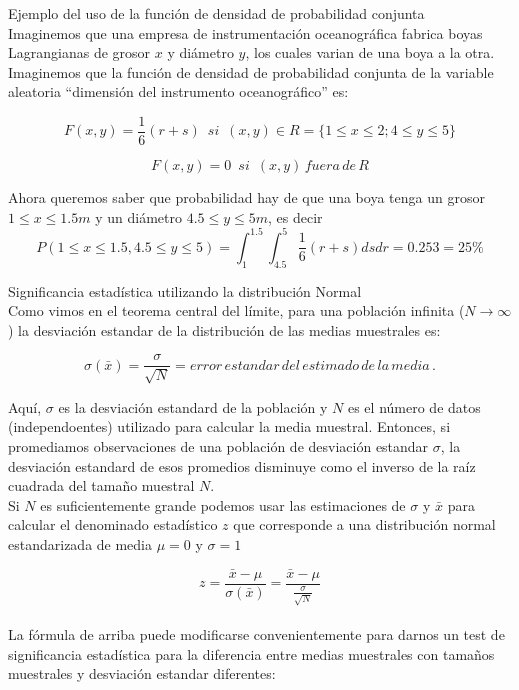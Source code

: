 \documentclass[
]{agujournal2019}
\begin{document}
Ejemplo del uso de la función de densidad de probabilidad conjunta\\

Imaginemos que una empresa de instrumentación oceanográfica fabrica
boyas Lagrangianas de grosor \(x\) y diámetro \(y\), los cuales varian
de una boya a la otra. Imaginemos que la función de densidad de
probabilidad conjunta de la variable aleatoria ``dimensión del
instrumento oceanográfico'' es:

\[F(x,y)=\frac{1}{6}(r+s)\,\,\,si\,\,\,(x,y)\in R=\{1\le x \le 2 ; 4 \le y \le 5\}\]

\[F(x,y)=0\,\,\,si\,\,\,(x,y)\,fuera\,de\,R\]

Ahora queremos saber que probabilidad hay de que una boya tenga un
grosor \(1 \le x \le 1.5m\) y un diámetro \(4.5 \le y \le 5m\), es decir
\[P(1 \le x \le 1.5, 4.5 \le y \le 5)=\int^{1.5}_{1} \int^{5}_{4.5} \frac{1}{6}(r+s) ds dr = 0.253= 25\%\]

\vspace{0.5cm}

Significancia estadística utilizando la distribución Normal\\

Como vimos en el teorema central del límite, para una población infinita
(\(N\rightarrow\infty\)) la desviación estandar de la distribución de
las medias muestrales es:

\[\sigma(\bar{x})=\frac{\sigma}{\sqrt{N}}=error\,estandar\,del\,estimado\,de\,la\,media\,.\]

Aquí, \(\sigma\) es la desviación estandard de la población y \(N\) es
el número de datos (independoentes) utilizado para calcular la media
muestral. Entonces, si promediamos observaciones de una población de
desviación estandar \(\sigma\), la desviación estandard de esos
promedios disminuye como el inverso de la raíz cuadrada del tamaño
muestral \(N\).\\

Si \(N\) es suficientemente grande podemos usar las estimaciones de
\(\sigma\) y \(\bar{x}\) para calcular el denominado estadístico \(z\)
que corresponde a una distribución normal estandarizada de media
\(\mu=0\) y \(\sigma=1\)

\[z=\frac{\bar{x}-\mu}{\sigma(\bar{x})}=\frac{\bar{x}-\mu}{\frac{\sigma}{\sqrt{N}}}\]\\

La fórmula de arriba puede modificarse convenientemente para darnos un
test de significancia estadística para la diferencia entre medias
muestrales con tamaños muestrales y desviación estandar diferentes:
\end{document}
